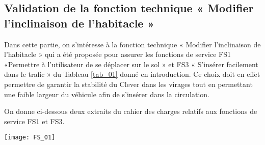 \begin{multicols}{2}
%

\section{Validation de la fonction technique « Modifier l'inclinaison de l'habitacle »}
\begin{obj}
Dans cette partie, on s'intéresse à la fonction technique « Modifier l'inclinaison de l'habitacle » qui a été proposée pour assurer les fonctions de service FS1 «Permettre à l'utilisateur de se déplacer sur le sol » et FS3 « S'insérer facilement dans le trafic » du Tableau \autoref{tab_01} donné en introduction. Ce choix doit en effet permettre de garantir la stabilité du Clever dans les virages tout en permettant une faible largeur du véhicule afin de s'insérer dans la circulation.
\end{obj}


On donne ci-dessous deux extraits du cahier des charges relatifs aux fonctions de service FS1 et FS3.

\begin{center}
\texttt{[image: FS\_01]}
\end{center}



\end{multicols}
